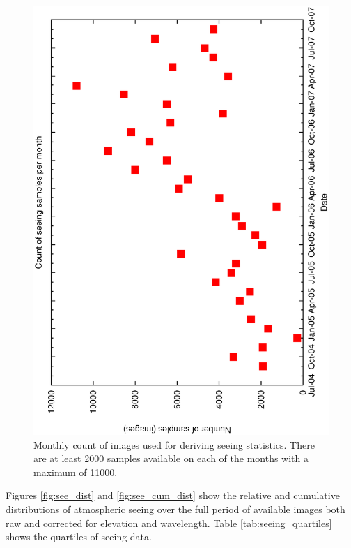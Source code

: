 {{\begin{figure}[htbp]
\begin{center}
    \includegraphics[scale=0.4, angle=-90]{figures/ecs/corr_monthly_bins.eps}
\end{center} 
\caption[Monthly count of images used for deriving seeing statistics.]
{Monthly count of images used for deriving seeing statistics. There are at least 2000 samples available on each of the months with a maximum of 11000.}
\label{fig:monthly_seeing_count}
\end{figure}


Figures \ref{fig:see_dist} and \ref{fig:see_cum_dist} show the relative and cumulative distributions of atmospheric seeing over the full period of available images both raw and corrected for elevation and wavelength. Table \ref{tab:seeing_quartiles} shows the quartiles of seeing data. 

}}
